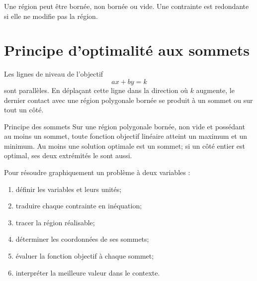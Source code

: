 \documentclass[12pt,a4paper,openany]{book}
\begin{document}
\begin{center}
\end{center}

Une région peut être bornée, non bornée ou vide. Une contrainte est redondante si elle ne modifie pas la région.

\section{Principe d'optimalité aux sommets}

Les lignes de niveau de l'objectif
\[
ax+by=k
\]
sont parallèles. En déplaçant cette ligne dans la direction où $k$ augmente, le dernier contact avec une région polygonale bornée se produit à un sommet ou sur tout un côté.

\begin{theorem}{Principe des sommets}{}
Sur une région polygonale bornée, non vide et possédant au moins un sommet, toute fonction objectif linéaire atteint un maximum et un minimum. Au moins une solution optimale est un sommet; si un côté entier est optimal, ses deux extrémités le sont aussi.
\end{theorem}

\begin{methodbox}
Pour résoudre graphiquement un problème à deux variables :
\begin{enumerate}
\item définir les variables et leurs unités;
\item traduire chaque contrainte en inéquation;
\item tracer la région réalisable;
\item déterminer les coordonnées de ses sommets;
\item évaluer la fonction objectif à chaque sommet;
\item interpréter la meilleure valeur dans le contexte.
\end{enumerate}
\end{methodbox}
\end{document}
